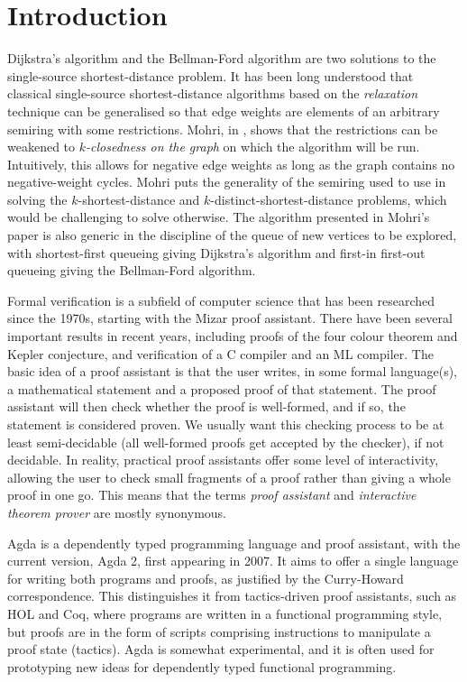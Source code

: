 
\section*{Introduction}
Dijkstra's algorithm and the Bellman-Ford algorithm are two solutions to the single-source shortest-distance problem.
It has been long understood that classical single-source shortest-distance algorithms based on the \emph{relaxation} technique can be generalised so that edge weights are elements of an arbitrary semiring with some restrictions\cite{ahl74}.
Mohri, in \cite{Mohri02}, shows that the restrictions can be weakened to \emph{$k$-closedness on the graph} on which the algorithm will be run.
Intuitively, this allows for negative edge weights as long as the graph contains no negative-weight cycles.
Mohri puts the generality of the semiring used to use in solving the $k$-shortest-distance and $k$-distinct-shortest-distance problems, which would be challenging to solve otherwise.
The algorithm presented in Mohri's paper is also generic in the discipline of the queue of new vertices to be explored, with shortest-first queueing giving Dijkstra's algorithm and first-in first-out queueing giving the Bellman-Ford algorithm.

Formal verification is a subfield of computer science that has been researched since the 1970s\cite{DBLP:conf/aisc/2008}, starting with the Mizar proof assistant\cite{Naumowicz2009}.
There have been several important results in recent years, including proofs of the four colour theorem\cite{4-colour} and Kepler conjecture\cite{Hales-Kepler}, and verification of a C compiler\cite{Leroy-Compcert-CACM} and an ML compiler\cite{CakeML}.
The basic idea of a proof assistant is that the user writes, in some formal language(s), a mathematical statement and a proposed proof of that statement.
The proof assistant will then check whether the proof is well-formed, and if so, the statement is considered proven.
We usually want this checking process to be at least semi-decidable (all well-formed proofs get accepted by the checker), if not decidable.
In reality, practical proof assistants offer some level of interactivity, allowing the user to check small fragments of a proof rather than giving a whole proof in one go.
This means that the terms \emph{proof assistant} and \emph{interactive theorem prover} are mostly synonymous.

Agda is a dependently typed programming language and proof assistant, with the current version, Agda 2, first appearing in 2007\cite{Norell07}.
It aims to offer a single language for writing both programs and proofs, as justified by the Curry-Howard correspondence\cite{curry1980h}.
This distinguishes it from tactics-driven proof assistants, such as HOL and Coq, where programs are written in a functional programming style, but proofs are in the form of scripts comprising instructions to manipulate a proof state (tactics).
Agda is somewhat experimental, and it is often used for prototyping new ideas for dependently typed functional programming.

